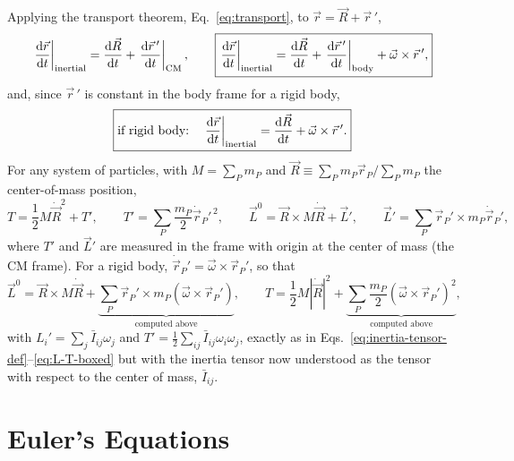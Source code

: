 \documentclass[11pt]{article}
\begin{document}
Applying the transport theorem, Eq.~\eqref{eq:transport}, to $\vec r=\vec R+\vec r\,'$,
\begin{equation}
\left.\frac{\mathrm{d} \vec r}{\mathrm{d} t}\right|_{\mathrm{inertial}} = \frac{\mathrm{d} \vec R}{\mathrm{d} t}+\left.\frac{\mathrm{d} \vec r\,'}{\mathrm{d} t}\right|_{\mathrm{CM}}, \qquad
\boxed{\left.\frac{\mathrm{d} \vec r}{\mathrm{d} t}\right|_{\mathrm{inertial}} = \frac{\mathrm{d} \vec R}{\mathrm{d} t}+\left.\frac{\mathrm{d} \vec r\,'}{\mathrm{d} t}\right|_{\mathrm{body}}+\vec\omega\times\vec r\,',}
\label{eq:transport-r}
\end{equation}
and, since $\vec r\,'$ is constant in the body frame for a rigid body,
\begin{equation}
\boxed{\text{if rigid body:}\quad \left.\frac{\mathrm{d} \vec r}{\mathrm{d} t}\right|_{\mathrm{inertial}} = \frac{\mathrm{d} \vec R}{\mathrm{d} t}+\vec\omega\times\vec r\,'.}
\label{eq:transport-rigid}
\end{equation}
For any system of particles, with $M=\sum_P m_P$ and $\vec R\equiv\sum_P m_P\vec r_P/\sum_P m_P$ the center-of-mass position,
\begin{equation}
T = \frac12 M\dot{\vec R}^2+T', \qquad T'=\sum_P\frac{m_P}{2}\dot{\vec r}_P'^{\,2}, \qquad
\vec L^0 = \vec R\times M\dot{\vec R}+\vec L', \qquad \vec L'=\sum_P \vec r_P'\times m_P\dot{\vec r}_P',
\label{eq:general-split}
\end{equation}
where $T'$ and $\vec L'$ are measured in the frame with origin at the center of mass (the CM frame). For a rigid body, $\dot{\vec r}_P'=\vec\omega\times\vec r_P'$, so that
\begin{equation}
\vec L^0 = \vec R\times M\dot{\vec R}+\underbrace{\sum_P \vec r_P'\times m_P(\vec\omega\times\vec r_P')}_{\text{computed above}}, \qquad
T = \frac12 M\left|\dot{\vec R}\right|^2+\underbrace{\sum_P\frac{m_P}{2}\left(\vec\omega\times\vec r_P'\right)^2}_{\text{computed above}},
\label{eq:general-rigid-split}
\end{equation}
with $L_i'=\sum_j \bar I_{ij}\omega_j$ and $T'=\frac12\sum_{ij}\bar I_{ij}\omega_i\omega_j$, exactly as in Eqs.~\eqref{eq:inertia-tensor-def}--\eqref{eq:L-T-boxed} but with the inertia tensor now understood as the tensor with respect to the center of mass, $\bar I_{ij}$.

\section{Euler's Equations}
\end{document}
